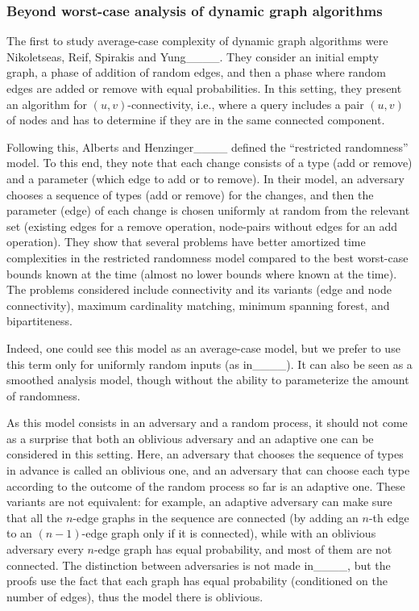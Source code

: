 \subsubsection{Beyond worst-case analysis of dynamic graph algorithms}

The first to study average-case complexity of dynamic graph algorithms were 
Nikoletseas, Reif, Spirakis and Yung____.
They consider an initial empty graph, a phase of addition of random edges, and then a phase where random edges are added or remove with equal probabilities. 
In this setting, they present an algorithm for $(u,v)$-connectivity, i.e., where a query includes a pair $(u,v)$ of nodes and has to determine if they are in the same connected component.

Following this, Alberts and Henzinger____ 
defined the ``restricted randomness'' model.
To this end, they note that each change consists of a type (add or remove) and a parameter (which edge to add or to remove).
In their model, an adversary chooses a sequence of types (add or remove) for the changes,
and then the parameter (edge) of each change is chosen uniformly at random from the relevant set (existing edges for a remove operation, node-pairs without edges for an add operation).
They show that several problems have better amortized time complexities in the restricted randomness model compared to the best worst-case bounds known at the time (almost no lower bounds where known at the time).
The problems considered include connectivity and its variants (edge and node connectivity), 
maximum cardinality matching, 
minimum spanning forest, and bipartiteness. 

Indeed, one could see this model as an average-case model, but we prefer to use this term only for uniformly random inputs (as in____). 
It can also be seen as a smoothed analysis model, though without the ability to parameterize the amount of randomness.

As this model consists in an adversary and a random process, it should not come as a surprise that both an oblivious adversary and an adaptive one can be considered in this setting.
Here, an adversary that chooses the sequence of types in advance is called an oblivious one, and an adversary that can choose each type according to the outcome of the random process so far is an adaptive one.
These variants are not equivalent:
for example, an adaptive adversary can make sure that all the $n$-edge graphs in the sequence are connected (by adding an $n$-th edge to an $(n-1)$-edge graph only if it is connected), while with an oblivious adversary every $n$-edge graph has equal probability, and most of them are not connected.
The distinction between adversaries is not made in____, but the proofs use the fact that each graph has equal probability (conditioned on the number of edges), thus the model there is oblivious.
 
